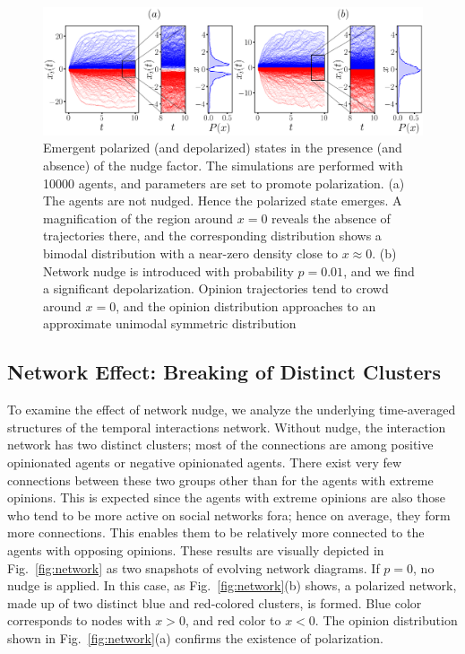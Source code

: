\begin{figure}[!htpb]
    \centering
    \includegraphics[width=\textwidth]{chapters/chapter2/trajectory_figma.pdf}
    \caption{Emergent polarized (and depolarized) states in the presence (and absence) of the nudge factor. The simulations are performed with 10000 agents, and parameters are set to promote polarization. (a) The agents are not nudged. Hence the polarized state emerges. A magnification of the region around $x=0$ reveals the absence of trajectories there, and the corresponding distribution shows a bimodal distribution with a near-zero density close to $x\approx 0$. (b) Network nudge is introduced with probability $p=0.01$, and we find a significant depolarization. Opinion trajectories tend to crowd around $x=0$, and the opinion distribution approaches to an approximate unimodal symmetric distribution}
    \label{fig:trajectory}
\end{figure}

\subsection{Network Effect: Breaking of Distinct Clusters}

To examine the effect of network nudge, we analyze the underlying time-averaged structures of the temporal interactions network. Without nudge, the interaction network has two distinct clusters; most of the connections are among positive opinionated agents or negative opinionated agents. There exist very few connections between these two groups other than for the agents with extreme opinions.
This is expected since the agents with extreme opinions are also those who tend to be more active on social networks fora; hence on average, they form more connections. This enables them to be relatively more connected to the agents with opposing opinions. These results are visually depicted in Fig.~\ref{fig:network} as two snapshots of evolving network diagrams. If $p=0$, no nudge is applied. In this case, as Fig.~\ref{fig:network}(b) shows, a polarized network, made up of two distinct blue and red-colored clusters, is formed. Blue color corresponds to nodes with $x > 0$, and red color to $x< 0$. The opinion distribution shown in Fig.~\ref{fig:network}(a) confirms the existence of polarization.

